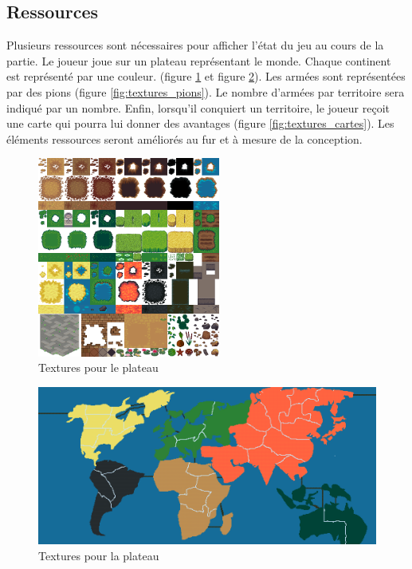 \subsection{Ressources}
    Plusieurs ressources sont nécessaires pour afficher l'état du jeu au cours de la partie. 
    Le joueur joue sur un plateau représentant le monde. Chaque continent est représenté par une couleur.  (figure \ref{fig:textures_plateau} et figure \ref{fig:textures_plateau2}). Les armées sont représentées par des pions (figure \ref{fig:textures_pions}). Le nombre d'armées par territoire sera indiqué par un nombre. Enfin, lorsqu'il conquiert un territoire, le joueur reçoit une carte qui pourra lui donner des avantages (figure \ref{fig:textures_cartes}). Les éléments ressources seront améliorés au fur et à mesure de la conception. 
    
    \begin{figure}[!htbp]
        \centering
        \includegraphics[width=6cm]{Images/terrain.png}
        \caption{Textures pour le plateau}
        \label{fig:textures_plateau}
    \end{figure}

    
    \begin{figure}[!htbp]
        \centering
        \includegraphics[width=13cm]{Images/map_jeu.png}
        \caption{Textures pour la plateau}
        \label{fig:textures_plateau2}
    \end{figure}
    
